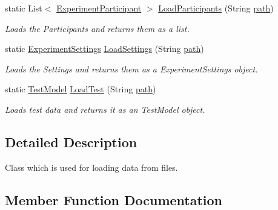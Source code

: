 \begin{DoxyCompactItemize}
static List$<$ \hyperlink{class_web_analyzer_1_1_models_1_1_base_1_1_experiment_participant}{Experiment\+Participant} $>$ \hyperlink{class_web_analyzer_1_1_controller_1_1_load_controller_adc9166c45bf2b2a3fe1b89dc72e539bc}{Load\+Participants} (String \hyperlink{_u_i_2_h_t_m_l_resources_2js_2src_2create__experiment_8js_aa72e0c8a20e6bcc571d3a1c51846e627}{path})
\begin{DoxyCompactList}\small\item\em Loads the Participants and returns them as a list. \end{DoxyCompactList}\item 
static \hyperlink{class_web_analyzer_1_1_models_1_1_settings_model_1_1_experiment_settings}{Experiment\+Settings} \hyperlink{class_web_analyzer_1_1_controller_1_1_load_controller_aac7916dc05a2869790dd010a8f5477d4}{Load\+Settings} (String \hyperlink{_u_i_2_h_t_m_l_resources_2js_2src_2create__experiment_8js_aa72e0c8a20e6bcc571d3a1c51846e627}{path})
\begin{DoxyCompactList}\small\item\em Loads the Settings and returns them as a Experiment\+Settings object. \end{DoxyCompactList}\item 
static \hyperlink{class_web_analyzer_1_1_models_1_1_data_model_1_1_test_model}{Test\+Model} \hyperlink{class_web_analyzer_1_1_controller_1_1_load_controller_ac708d0fc98accf17574e97f1e59a7dc9}{Load\+Test} (String \hyperlink{_u_i_2_h_t_m_l_resources_2js_2src_2create__experiment_8js_aa72e0c8a20e6bcc571d3a1c51846e627}{path})
\begin{DoxyCompactList}\small\item\em Loads test data and returns it as an Test\+Model object. \end{DoxyCompactList}\end{DoxyCompactItemize}


\subsection{Detailed Description}
Class which is used for loading data from files. 



\subsection{Member Function Documentation}
\hypertarget{class_web_analyzer_1_1_controller_1_1_load_controller_a49122060869d7d678c3f0518f70bbe04}{}
